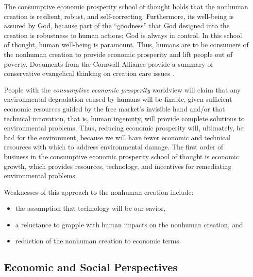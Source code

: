 \documentclass[12pt]{article}
\begin{document}
The consumptive economic prosperity school of thought 
holds that the nonhuman creation is resilient, robust, and self-correcting.
Furthermore, its well-being is assured by God, 
because part of the ``goodness'' that God designed into the creation
is robustness to human actions; 
God is always in control.
In this school of thought, human well-being is paramount. 
Thus, humans are to be consumers of the nonhuman creation 
to provide economic prosperity and
lift people out of poverty.
Documents from the Cornwall Alliance 
provide a summary of conservative evangelical thinking on creation care issues
\autocite{Cornwall:2006aa}.

People with the \emph{consumptive economic prosperity} worldview
will claim that any environmental degradation caused by humans will be fixable,
given sufficient economic resources guided by the free market's invisible hand
and/or that technical innovation, that is, human ingenuity, 
will provide complete solutions to environmental problems.
Thus, reducing economic prosperity will, ultimately, be bad for the environment, because
we will have fewer economic and technical resources with which to address environmental damage.
The first order of business in the consumptive economic prosperity school of thought
is economic growth, 
which provides resources, technology, and incentives for remediating environmental problems. 

Weaknesses of this approach to the nonhuman creation include:
%
\begin{itemize}

  \item the assumption that technology will be our savior, 

  \item a reluctance to grapple with human impacts on the nonhuman creation, and 

  \item reduction of the nonhuman creation to economic terms.

\end{itemize}


\subsection{Economic and Social Perspectives}
\label{sec:economic_and_social}
\end{document}
